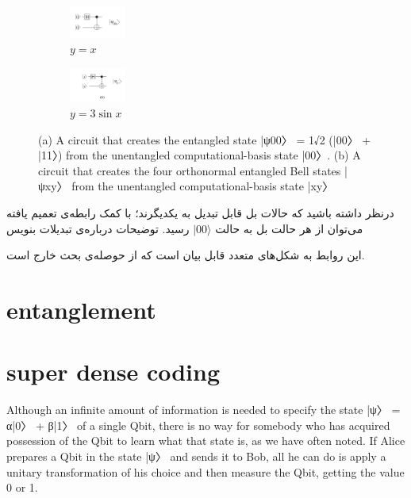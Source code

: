 \documentclass{book}
\begin{document}
\begin{figure}
	\centering
	\begin{subfigure}[b]{}
		\centering
		\includegraphics[width=0.2\textwidth]{psi00.png}
		\caption{$y=x$}
		\label{fig:y equals x}
	\end{subfigure}
	\hfill
	\begin{subfigure}[b]{}
		\centering
		\includegraphics[width=0.2\textwidth]{psixy.png}
		\caption{$y=3\sin x$}
		\label{fig:three sin x}
	\end{subfigure}
	\caption{(a) A circuit that creates the entangled state
		|ψ00〉 = 1√2
		(|00〉 + |11〉) from the unentangled computational-basis
		state |00〉. (b) A circuit that creates the four orthonormal entangled
		Bell states |ψxy〉 from the unentangled computational-basis state |xy〉}
	\label{fig:three graphs}
\end{figure}


درنظر داشته باشید که حالات بل قابل تبدیل به یکدیگرند؛ با کمک رابطه‌ی تعمیم یافته ‌می‌توان از هر حالت بل به حالت $\vert00 \rangle$ رسید.
توضیحات درباره‌ی تبدیلات بنویس

این روابط به شکل‌های متعدد قابل بیان است که از حوصله‌ی بحث خارج است.







\section{entanglement}
\section{super dense coding}


Although an infinite amount of information is needed to specify the state |ψ〉 = α|0〉 + β|1〉 of a single Qbit, there is no way for somebody who has acquired possession of the Qbit to learn what that state is, as we have often noted. If Alice prepares a Qbit in the state |ψ〉 and sends it to Bob, all he can do is apply a unitary transformation of his choice and then measure the Qbit, getting the value 0 or 1. 
\end{document}
